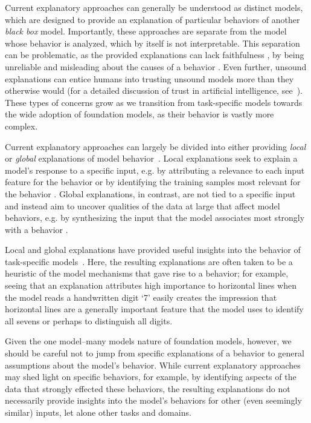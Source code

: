 Current explanatory approaches can generally be understood as distinct models, which are designed to provide an explanation of particular behaviors of another \textit{black box} model. Importantly, these approaches are separate from the model whose behavior is analyzed, which by itself is not interpretable. This separation can be problematic, as the provided explanations can lack faithfulness \citep{jacovi2020towards}, by being unreliable and misleading about the causes of a behavior \citep[cf.][]{rudin2019stop}.
Even further, unsound explanations can entice humans into trusting unsound models more than they otherwise would (for a detailed discussion of trust in artificial intelligence, see~\citet{jacovi2021formalizing}).
These types of concerns grow as we transition from task-specific models towards the wide adoption of foundation models, as their behavior is vastly more complex.

Current explanatory approaches can largely be divided into either providing \textit{local} or \textit{global} explanations of model behavior~\citep{doshi2017towards}. Local explanations seek to explain a model's response to a specific input, e.g. by attributing a relevance to each input feature for the behavior or by identifying the training samples most relevant for the behavior \citep{simonyan2013deep,bach2015pixel,sundararajan2017axiomatic,shrikumar2017learning,springenberg2014striving,zeiler2014visualizing,lundberg2017unified,zintgraf2017visualizing,Fong_2017_ICCV,koh2017understanding}. Global explanations, in contrast, are not tied to a specific input and instead aim to uncover qualities of the data at large that affect model behaviors, e.g. by synthesizing the input that the model associates most strongly with a behavior \citep{simonyan2013deep,nguyen2016synthesizing}. 

Local and global explanations have provided useful insights into the behavior of task-specific models~\citep[e.g. ][]{li2015visualizing,wang2015visual,lapuschkin2019unmasking,thomas2019analyzing,poplin2018prediction}. Here, the resulting explanations are often taken to be a heuristic of the model mechanisms that gave rise to a behavior; for example, seeing that an explanation attributes high importance to horizontal lines when the model reads a handwritten digit `7' easily creates the impression that horizontal lines are a generally important feature that the model uses to identify all sevens or perhaps to distinguish all digits.

Given the one model--many models nature of foundation models, however, we should be careful not to jump from specific explanations of a behavior to general assumptions about the model's behavior. While current explanatory approaches may shed light on specific behaviors, for example, by identifying aspects of the data that strongly effected these behaviors, the resulting explanations do not necessarily provide insights into the model's behaviors for other (even seemingly similar) inputs, let alone other tasks and domains.

